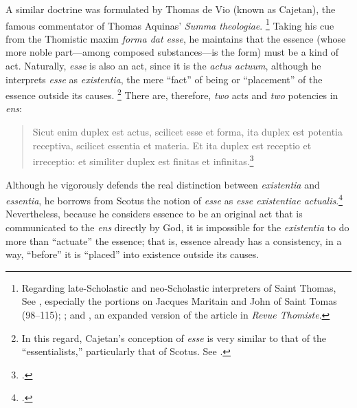 A similar doctrine was formulated by Thomas de Vio (known as Cajetan), the famous commentator of Thomas Aquinas' \emph{Summa theologiae}.%
%
\footnote{Regarding late-Scholastic and neo-Scholastic interpreters of Saint Thomas, See \cite{contat:figure}, especially the portions on Jacques Maritain and John of Saint Tomas (98--115); \cite{fabro:obscurcissement}; and \cite[604--628]{fabro:partecipazione}, an expanded version of the article in \emph{Revue Thomiste}.} Taking his cue from the Thomistic maxim \emph{forma dat esse}, he maintains that the essence (whose more noble part---among composed substances---is the form) must be a kind of act. Naturally, \emph{esse} is also an act, since it is the \emph{actus actuum}, although he interprets \emph{esse} as \emph{existentia}, the mere ``fact'' of being or ``placement'' of the essence outside its causes.%
%
\footnote{In this regard, Cajetan's conception of \emph{esse} is very similar to that of the ``essentialists,'' particularly that of Scotus. See \cite[272]{gilson:cajetan}.} There are, therefore, \emph{two} acts and \emph{two} potencies in \emph{ens}:
%
\begin{quotation}
Sicut enim duplex est actus, scilicet esse et forma, ita duplex est potentia receptiva, scilicet essentia et materia. Et ita duplex est receptio et irreceptio: et similiter duplex est finitas et infinitas.\footcite[73b, X]{cajetan:commentaries}
\end{quotation}
%
Although he vigorously defends the real distinction between \emph{existentia} and \emph{essentia}, he borrows from Scotus the notion of \emph{esse} as \emph{esse existentiae actualis}.\footcite[272--273]{gilson:cajetan} Nevertheless, because he considers essence to be an original act that is communicated to the \emph{ens} directly by God, it is impossible for the \emph{existentia} to do more than ``actuate'' the essence; that is, essence already has a consistency, in a way, ``before'' it is ``placed'' into existence outside its causes.%
%
